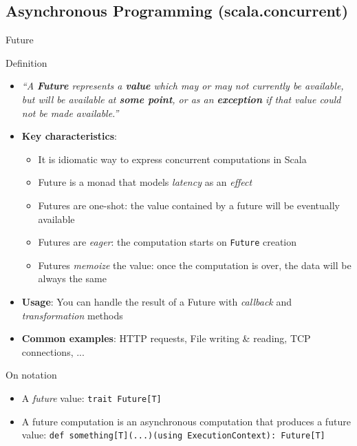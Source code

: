 \documentclass[presentation, 9pt]{beamer}\mode<presentation>{\usetheme{AMSBolognaFC}}
\begin{document}
\subsection{Asynchronous Programming (scala.concurrent)}
\begin{frame}[fragile]{Future}
	\begin{alertblock}{Definition}
		\centering
		\begin{itemize}
			\item \emph{``A \textbf{Future} represents a \textbf{value} which may or may not currently be available, but will be available at \textbf{some point}, or as an \textbf{exception} if that value could not be made available.''}
		\end{itemize}
	\end{alertblock}
\begin{itemize}
\item \textbf{Key characteristics}:
\begin{itemize}
	\item It is  idiomatic way to express concurrent computations in Scala
	\item Future is a monad that models \emph{latency} as an \emph{effect}
	\item Futures are one-shot: the value contained by a future will be eventually available
	\item Futures are \emph{eager}: the computation starts on \texttt{Future} creation
	\item Futures \emph{memoize} the value: once the computation is over, the data will be always the same
\end{itemize}
\item \textbf{Usage}: You can handle the result of a Future with \emph{callback} and \emph{transformation} methods
\item \textbf{Common examples}: HTTP requests, File writing \& reading, TCP connections, ...
\end{itemize}
\begin{alertblock}{On notation}
	\begin{itemize}
		\item A \emph{future} value: \texttt{trait Future[T]}
  	\item A future computation is an asynchronous computation that produces a future value: \texttt{def something[T](...)(using ExecutionContext): Future[T]}
	\end{itemize}
\end{alertblock}
\end{frame}
\end{document}
